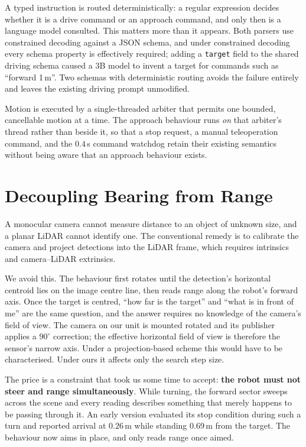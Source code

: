 \documentclass[conference]{IEEEtran}
\begin{document}
A typed instruction is routed deterministically: a regular expression decides
whether it is a drive command or an approach command, and only then is a
language model consulted. This matters more than it appears. Both parsers use
constrained decoding against a JSON schema, and under constrained decoding every
schema property is effectively required; adding a \texttt{target} field to the
shared driving schema caused a 3B model to invent a target for commands such as
``forward 1\,m''. Two schemas with deterministic routing avoids the failure
entirely and leaves the existing driving prompt unmodified.

Motion is executed by a single-threaded arbiter that permits one bounded,
cancellable motion at a time. The approach behaviour runs \emph{on} that
arbiter's thread rather than beside it, so that a stop request, a manual
teleoperation command, and the $0.4$\,s command watchdog retain their existing
semantics without being aware that an approach behaviour exists.

\section{Decoupling Bearing from Range}
\label{sec:decouple}

A monocular camera cannot measure distance to an object of unknown size, and a
planar LiDAR cannot identify one. The conventional remedy is to calibrate the
camera and project detections into the LiDAR frame, which requires intrinsics
and camera--LiDAR extrinsics.

We avoid this. The behaviour first rotates until the detection's horizontal
centroid lies on the image centre line, then reads range along the robot's
forward axis. Once the target is centred, ``how far is the target'' and ``what
is in front of me'' are the same question, and the answer requires no knowledge
of the camera's field of view. The camera on our unit is mounted rotated and its
publisher applies a $90^\circ$ correction; the effective horizontal field of
view is therefore the sensor's narrow axis. Under a projection-based scheme this
would have to be characterised. Under ours it affects only the search step size.

The price is a constraint that took us some time to accept: \textbf{the robot
must not steer and range simultaneously}. While turning, the forward sector
sweeps across the scene and every reading describes something that merely
happens to be passing through it. An early version evaluated its stop condition
during such a turn and reported arrival at $0.26$\,m while standing $0.69$\,m
from the target. The behaviour now aims in place, and only reads range once
aimed.
\end{document}
